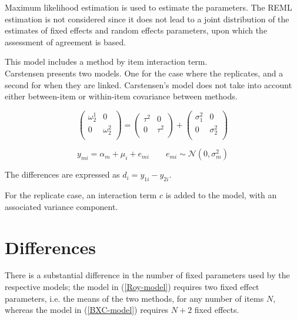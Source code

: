 \documentclass[12pt, a4paper]{report}
\theoremstyle{plain}
\theoremstyle{definition}
\theoremstyle{remark}
\begin{document}
Maximum likelihood estimation is used to estimate the parameters.
The REML estimation is not considered since it does not lead to a
joint distribution of the estimates of fixed effects and random
effects parameters, upon which the assessment of agreement is
based.









This model includes a method by item interaction term.\\

Carstensen presents two models. One for the case where the replicates, and a second for when they are linked. Carstensen's model does not take into account either between-item or within-item covariance between methods.


\[\left(\begin{array}{cc}
\omega^1_2  & 0 \\
0 & \omega^2_2 \\
\end{array}  \right)
=  \left(
\begin{array}{cc}
\tau^2  & 0 \\
0 & \tau^2 \\
\end{array} \right)+
\left(
\begin{array}{cc}
\sigma^2_1  & 0 \\
0 & \sigma^2_2 \\
\end{array}\right)
\]

\begin{equation}
y_{mi}  = \alpha_{m} + \mu_{i} + e_{mi} \qquad  e_{mi} \sim \mathcal{N}(0,\sigma^{2}_{m})
\end{equation}

The differences are expressed as $d_{i} = y_{1i} - y_{2i}$.

For the replicate case, an interaction term $c$ is added to the model, with an associated variance component.



\section{Differences}
There is a substantial difference in the number of fixed parameters used by the respective models; the model in (\ref{Roy-model}) requires two fixed effect parameters, i.e. the means of the two methods, for any number of items $N$, whereas the model in (\ref{BXC-model}) requires $N+2$ fixed effects.
\end{document}
